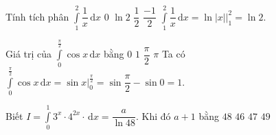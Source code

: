 \begin{ex}%
	Tính tích phân $\displaystyle\int\limits_1^2 \dfrac{1}{x}\mathrm{\,d}x$
	\choice
	{$0$}
	{\True $\ln 2$}
	{$\dfrac{1}{2}$}
	{$\dfrac{-1}{2}$}
	\loigiai
	{
		$\displaystyle\int\limits_1^2 \dfrac{1}{x}\mathrm{\,d}x=\left. \ln \left| x\right| \right| _1^2 =\ln 2$.
	}
\end{ex}

\begin{ex}%
	Giá trị của $\displaystyle\int\limits_0^{\frac{\pi}{2}} \cos x\mathrm{\,d}x$ bằng
	\choice
	{$0$}
	{\True $1$}
	{$\dfrac{\pi}{2}$}
	{$\pi$}
	\loigiai
	{
	Ta có $\displaystyle\int\limits_0^{\frac{\pi}{2}} \cos x\mathrm{\,d}x = \sin x\Big|_0^{\frac{\pi}{2}} = \sin\dfrac{\pi}{2}-\sin 0 = 1$.
	}
\end{ex}

\begin{ex}%
	Biết $I=\displaystyle\int\limits_0^1 3^x \cdot 4^{2 x} \cdot \mathrm{\,d} x=\dfrac{a}{\ln 48}$.  Khi đó $a+1$ bằng
	\choice
	{\True $48$}
	{$46$}
	{$47$}
	{$49$}
\end{ex}

